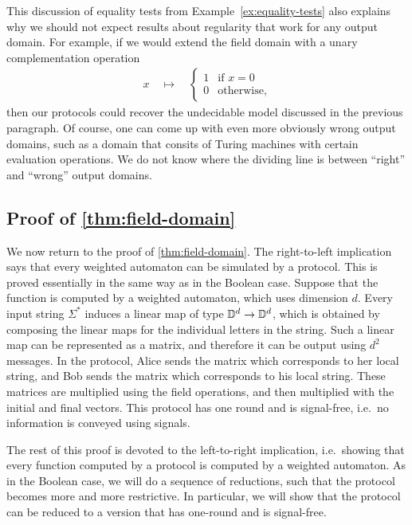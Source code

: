 \begin{myexample}\label{ex:wrong-output-domains}
 This discussion of equality tests from Example~\ref{ex:equality-tests} also explains why we should not expect results about regularity that work for any output domain. For example, if we would extend the field domain with a unary complementation operation 
 \begin{align*}
 x 
 \quad \mapsto \quad 
 \begin{cases}
    1 & \text{if $x =0$}\\
    0 & \text{otherwise},
\end{cases}
 \end{align*}
 then our protocols could recover the undecidable model discussed in the previous paragraph.  Of course, one can come up with even more obviously wrong output domains, such as a domain that consits of Turing machines with certain evaluation operations. We do not know where the dividing line is between ``right'' and ``wrong'' output domains.
\end{myexample}


\subsection{Proof of \cref{thm:field-domain}}
\label{sec:proof-of-thm-field-domain}
We now return to the proof of \cref{thm:field-domain}. The right-to-left implication says that every weighted automaton can be simulated by a protocol. This is proved essentially in the same way as in the Boolean case. Suppose that the function is computed by a weighted automaton, which uses  dimension $d$. Every input string $\Sigma^*$ induces a linear map of type $\mathbb D^d \to \mathbb D^d$, which is obtained by composing the linear maps for the individual letters in the string.  Such a linear map can be represented as a matrix, and therefore it can be output using $d^2$ messages.  In the protocol, Alice sends the matrix  which corresponds to her local string, and Bob sends the  matrix which corresponds to  his local string. These matrices are multiplied using the field operations, and then multiplied with the initial and final vectors. This protocol has one round and is signal-free, i.e.~no information is conveyed using signals.

The rest of this proof is devoted to the left-to-right implication, i.e.~showing that every function computed by a protocol is computed by a weighted automaton. As in the Boolean case, we will do a sequence of reductions, such that the protocol becomes more and more restrictive. In particular, we will show that the protocol can be reduced to a version that has one-round and  is signal-free.

